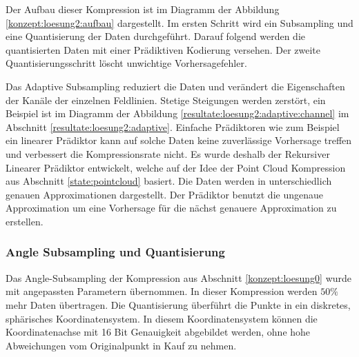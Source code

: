 Der Aufbau dieser Kompression ist im Diagramm der Abbildung \ref{konzept:loesung2:aufbau} dargestellt. Im ersten Schritt wird ein Subsampling und eine Quantisierung der Daten durchgeführt. Darauf folgend werden die quantisierten Daten mit einer Prädiktiven Kodierung versehen. Der zweite Quantisierungsschritt löscht unwichtige Vorhersagefehler. 

Das Adaptive Subsampling reduziert die Daten und verändert die Eigenschaften der Kanäle der einzelnen Feldlinien. Stetige Steigungen werden zerstört, ein Beispiel ist im Diagramm der Abbildung \ref{resultate:loesung2:adaptive:channel} im Abschnitt \ref{resultate:loesung2:adaptive}. Einfache Prädiktoren wie zum Beispiel ein linearer Prädiktor kann auf solche Daten keine zuverlässige Vorhersage treffen und verbessert die Kompressionsrate nicht. Es wurde deshalb der Rekursiver Linearer Prädiktor entwickelt, welche auf der Idee der Point Cloud Kompression aus Abschnitt \ref{state:pointcloud} basiert. Die Daten werden in unterschiedlich genauen Approximationen dargestellt. Der Prädiktor benutzt die ungenaue Approximation um eine Vorhersage für die nächst genauere Approximation zu erstellen.

\subsubsection{Angle Subsampling und Quantisierung}
Das Angle-Subsampling der Kompression aus Abschnitt \ref{konzept:loesung0} wurde mit angepassten Parametern übernommen. In dieser Kompression werden $50\%$ mehr Daten übertragen. Die Quantisierung überführt die Punkte in ein diskretes, sphärisches Koordinatensystem. In diesem Koordinatensystem können die Koordinatenachse mit 16 Bit Genauigkeit abgebildet werden, ohne hohe Abweichungen vom Originalpunkt in Kauf zu nehmen.

